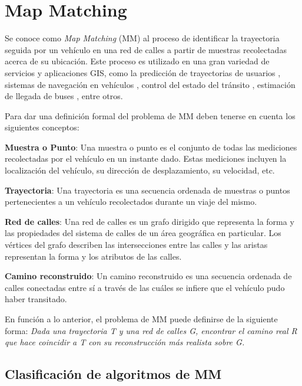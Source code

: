 \section{Map Matching}
\label{sec:map_matching}

Se conoce como \emph{Map Matching} (MM) al proceso de identificar la trayectoria seguida por un vehículo en una red de calles a partir de muestras recolectadas acerca de su ubicación. Este proceso es utilizado en una gran variedad de servicios y aplicaciones GIS, como la predicción de trayectorias de usuarios \cite{eisner2011algorithms}, sistemas de navegación en vehículos \cite{kim2001adaptive}, control del estado del tránsito \cite{thiagarajan2009vtrack}, estimación de llegada de buses \cite{thiagarajan2010cooperative}, entre otros.

Para dar una definición formal del problema de MM deben tenerse en cuenta los siguientes conceptos:

\textbf{Muestra o Punto}: Una muestra o punto es el conjunto de todas las mediciones recolectadas por el vehículo en un instante dado. Estas mediciones incluyen la localización del vehículo, su dirección de desplazamiento, su velocidad, etc.

\textbf{Trayectoria}: Una trayectoria es una secuencia ordenada de muestras o puntos pertenecientes a un vehículo recolectados durante un viaje del mismo.

\textbf{Red de calles}: Una red de calles es un grafo dirigido que representa la forma y las propiedades del sistema de calles de un área geográfica en particular. Los vértices del grafo describen las intersecciones entre las calles y las aristas representan la forma y los atributos de las calles.

\textbf{Camino reconstruido}: Un camino reconstruido es una secuencia ordenada de calles conectadas entre sí a través de las cuáles se infiere que el vehículo pudo haber transitado.

En función a lo anterior, el problema de MM puede definirse de la siguiente forma: \emph{Dada una trayectoria T y una red de calles G, encontrar el camino real R que hace coincidir a T con su reconstrucción más realista sobre G.}

\subsection{Clasificación de algoritmos de MM}

